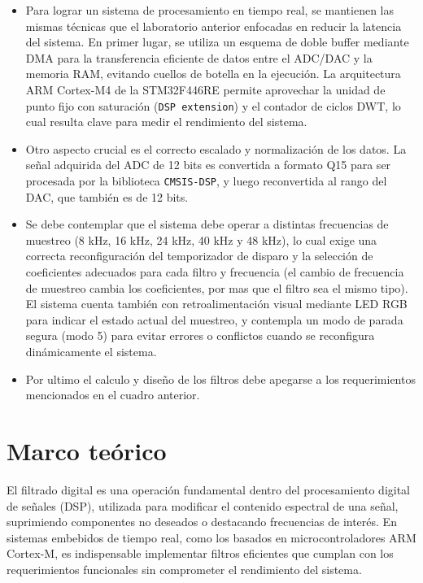 \documentclass[12pt]{article}
\begin{document}
	\begin{itemize}
		\item Para lograr un sistema de procesamiento en tiempo real, se mantienen las mismas técnicas que el laboratorio anterior enfocadas en reducir la latencia del sistema. En primer lugar, se utiliza un esquema de doble buffer mediante DMA para la transferencia eficiente de datos entre el ADC/DAC y la memoria RAM, evitando cuellos de botella en la ejecución. La arquitectura ARM Cortex-M4 de la STM32F446RE permite aprovechar la unidad de punto fijo con saturación (\texttt{DSP extension}) y el contador de ciclos DWT, lo cual resulta clave para medir el rendimiento del sistema.
		
		\item Otro aspecto crucial es el correcto escalado y normalización de los datos. La señal adquirida del ADC de 12 bits es convertida a formato Q15 para ser procesada por la biblioteca \texttt{CMSIS-DSP}, y luego reconvertida al rango del DAC, que también es de 12 bits.\newpage
		
		\item Se debe contemplar que el sistema debe operar a distintas frecuencias de muestreo (8 kHz, 16 kHz, 24 kHz, 40 kHz y 48 kHz), lo cual exige una correcta reconfiguración del temporizador de disparo y la selección de coeficientes adecuados para cada filtro y frecuencia (el cambio de frecuencia de muestreo cambia los coeficientes, por mas que el filtro sea el mismo tipo). El sistema cuenta también con retroalimentación visual mediante LED RGB para indicar el estado actual del muestreo, y contempla un modo de parada segura (modo 5) para evitar errores o conflictos cuando se reconfigura dinámicamente el sistema.
		
		\item Por ultimo el calculo y diseño de los filtros debe apegarse a los requerimientos mencionados en el cuadro anterior.
	\end{itemize}
	
	\section{Marco teórico}
	
	El filtrado digital es una operación fundamental dentro del procesamiento digital de señales (DSP), utilizada para modificar el contenido espectral de una señal, suprimiendo componentes no deseados o destacando frecuencias de interés. En sistemas embebidos de tiempo real, como los basados en microcontroladores ARM Cortex-M, es indispensable implementar filtros eficientes que cumplan con los requerimientos funcionales sin comprometer el rendimiento del sistema.
	
\end{document}
